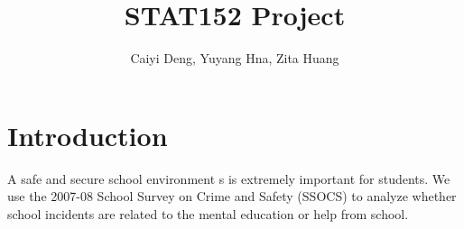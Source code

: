 \documentclass[11pt]{article}
\title{STAT152 Project}
\author {Caiyi Deng, Yuyang Hna, Zita Huang}
\begin{document}


\maketitle

\section{Introduction}

\vspace{0.2cm}

A safe and secure school environment s is extremely important for students.
We use the 2007-08 School Survey on Crime and Safety (SSOCS) to analyze whether school incidents are related to the mental education or help from school. 
\end{document}
